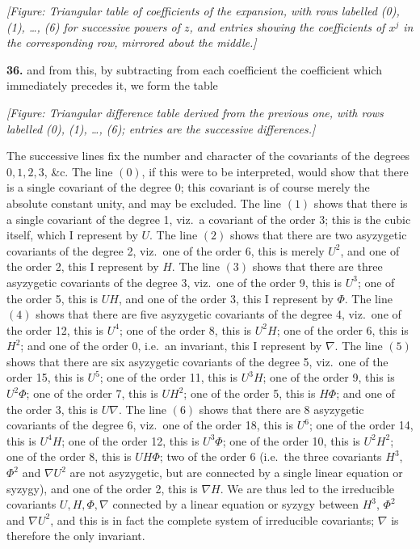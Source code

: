 \documentclass[11pt]{article}
\begin{document}
\textit{[Figure: Triangular table of coefficients of the expansion, with rows labelled (0), (1), \ldots, (6) for successive powers of $z$, and entries showing the coefficients of $x^j$ in the corresponding row, mirrored about the middle.]}

\textbf{36.} and from this, by subtracting from each coefficient the coefficient which immediately precedes it, we form the table

\textit{[Figure: Triangular difference table derived from the previous one, with rows labelled (0), (1), \ldots, (6); entries are the successive differences.]}

The successive lines fix the number and character of the covariants of the degrees $0, 1, 2, 3$, \&c. The line $(0)$, if this were to be interpreted, would show that there is a single covariant of the degree $0$; this covariant is of course merely the absolute constant unity, and may be excluded. The line $(1)$ shows that there is a single covariant of the degree 1, viz.\ a covariant of the order 3; this is the cubic itself, which I represent by $U$. The line $(2)$ shows that there are two asyzygetic covariants of the degree 2, viz.\ one of the order 6, this is merely $U^2$, and one of the order 2, this I represent by $H$. The line $(3)$ shows that there are three asyzygetic covariants of the degree 3, viz.\ one of the order 9, this is $U^3$; one of the order 5, this is $UH$, and one of the order 3, this I represent by $\Phi$. The line $(4)$ shows that there are five asyzygetic covariants of the degree 4, viz.\ one of the order 12, this is $U^4$; one of the order 8, this is $U^2 H$; one of the order 6, this is $H^2$; and one of the order 0, i.e.\ an invariant, this I represent by $\nabla$. The line $(5)$ shows that there are six asyzygetic covariants of the degree 5, viz.\ one of the order 15, this is $U^5$; one of the order 11, this is $U^3 H$; one of the order 9, this is $U^2 \Phi$; one of the order 7, this is $UH^2$; one of the order 5, this is $H\Phi$; and one of the order 3, this is $U\nabla$. The line $(6)$ shows that there are 8 asyzygetic covariants of the degree 6, viz.\ one of the order 18, this is $U^6$; one of the order 14, this is $U^4 H$; one of the order 12, this is $U^3\Phi$; one of the order 10, this is $U^2 H^2$; one of the order 8, this is $U H \Phi$; two of the order 6 (i.e.\ the three covariants $H^3$, $\Phi^2$ and $\nabla U^2$ are not asyzygetic, but are connected by a single linear equation or syzygy), and one of the order 2, this is $\nabla H$. We are thus led to the irreducible covariants $U, H, \Phi, \nabla$ connected by a linear equation or syzygy between $H^3$, $\Phi^2$ and $\nabla U^2$, and this is in fact the complete system of irreducible covariants; $\nabla$ is therefore the only invariant.
\end{document}
